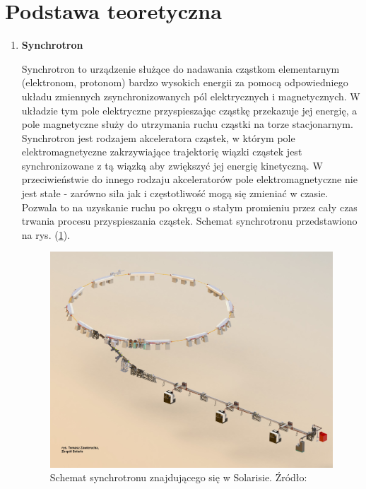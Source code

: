 \clearpage
\section{Podstawa teoretyczna}
\label{sec:podstawa}


\begin{enumerate}
	\item \textbf{Synchrotron}
	
	\hspace{2em} Synchrotron to urządzenie służące do nadawania cząstkom elementarnym (elektronom, protonom) bardzo wysokich energii za pomocą odpowiedniego układu zmiennych zsynchronizowanych pól elektrycznych i magnetycznych. W układzie tym pole elektryczne przyspieszając cząstkę przekazuje jej energię, a pole magnetyczne służy do utrzymania ruchu cząstki na torze stacjonarnym. 
	Synchrotron jest rodzajem akceleratora cząstek, w którym pole elektromagnetyczne zakrzywiające trajektorię wiązki cząstek jest synchronizowane z tą wiązką aby zwiększyć jej energię kinetyczną. W przeciwieństwie do innego rodzaju akceleratorów pole elektromagnetyczne nie jest stałe - zarówno siła jak i częstotliwość mogą się zmieniać w czasie. Pozwala to na uzyskanie ruchu po okręgu o stałym promieniu przez cały czas trwania procesu przyspieszania cząstek. Schemat synchrotronu przedstawiono na rys. (\ref{fig:schematSynchrotronu}).
	
	\begin{figure}[ht]
		\centering
		\includegraphics[width=0.9\linewidth]{Grafika/solarisMaszyna}
		\caption{Schemat synchrotronu znajdującego się w Solarisie. Źródło: \cite{synchrotron_uj_edu}}
		\label{fig:schematSynchrotronu}
	\end{figure}
	

\end{enumerate}

